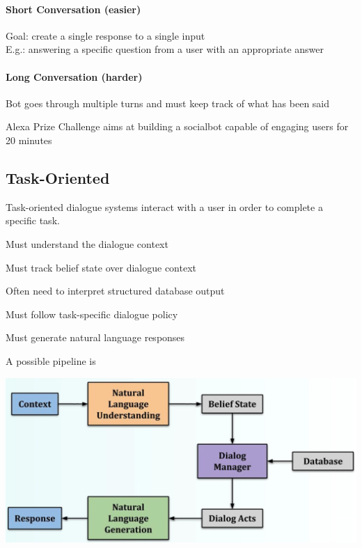 \documentclass[10pt]{report}
\begin{document}
\begin{multicols}{2}
\paragraph{Short Conversation (easier)}
\begin{list}{}{}
	\item Goal: create a single response to a single input\\
	E.g.: answering a specific question from a user with an appropriate answer
\end{list}
\paragraph{Long Conversation (harder)}
\begin{list}{}{}
	\item Bot goes through multiple turns and must keep track of what has been said
	\item Alexa Prize Challenge aims at building a socialbot capable of engaging users for 20 minutes
\end{list}
\end{multicols}
\subsection{Task-Oriented}
Task-oriented dialogue systems interact with a user in order to complete a specific task.
\begin{list}{}{}
	\item Must understand the dialogue context
	\item Must track belief state over dialogue context
	\item Often need to interpret structured database output
	\item Must follow task-specific dialogue policy
	\item Must generate natural language responses
\end{list}
A possible pipeline is
\begin{center}
	\includegraphics[scale=0.5]{116.png}
\end{center}
\end{document}
